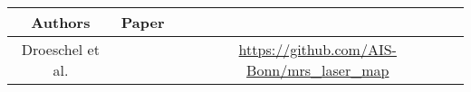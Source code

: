 \begin{tabular}{ccc}
	Authors & Paper & \acronym{url}\\ 
	\hline\hline
	Droeschel et al. & \cite{Droeschel} & \url{https://github.com/AIS-Bonn/mrs_laser_map}\\
\end{tabular}
